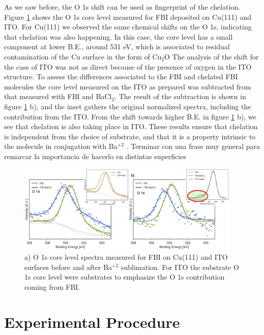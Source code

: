 \documentclass[aps,prl,reprint,longbibliography,superscriptaddress]{revtex4-1}
\def\Ba{Ba$^{+2}$ }
\newcommand{\completar}[1]{{\color{red} #1}}
\begin{document}
As we saw before, the O 1s shift can be used as fingerprint of the chelation. Figure \ref{XPS_FBI_Cu_ITO} shows the O 1s core level measured for FBI deposited on Cu(111) and ITO. For Cu(111) we observed the same chemical shifts on the O 1s, indicating that chelation was also happening. In this case, the core level has a small component at lower B.E., around 531 eV, which is associated to residual contamination of the Cu surface in the form of Cu$_2$O \cite{zhu_surface_2013}
The analysis of the shift for the case of ITO was not as direct because of the presence of oxygen in the ITO structure. To assess the differences associated to the FBI and chelated FBI molecules the core level measured on the ITO as prepared  was subtracted from that measured with FBI and BaCl$_2$. The result of the subtraction is shown in figure \ref{XPS_FBI_Cu_ITO} b), and the inset gathers the original normalized spectra, including the contribution from the ITO. From the shift towards higher B.E. in figure \ref{XPS_FBI_Cu_ITO} b), we see that chelation is also taking place in ITO. These results ensure that chelation is independent from the choice of substrate, and that it is a property intrinsic to the molecule in conjugation with \Ba. 
\completar{Terminar con una frase muy general para remarcar la importancia de hacerlo en distintas superficies}  


\begin{figure}[ht!]
	\includegraphics[width=0.95\textwidth]{figures/fig5_cu_ito.png}
	\caption{\label{XPS_FBI_Cu_ITO} 
    a) O 1s core level spectra measured for FBI on Cu(111) and ITO surfaces before and after \Ba sublimation. For ITO the substrate O 1s core level were substrates to emphasize the O 1s contribution coming from FBI.}
\end{figure}  


\section{Experimental Procedure}
\end{document}
